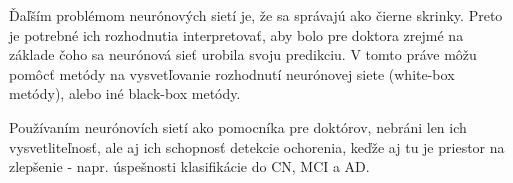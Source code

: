 Ďaľším problémom neurónových sietí je, že sa správajú ako čierne skrinky. Preto je potrebné ich rozhodnutia interpretovať, aby bolo pre doktora zrejmé na základe čoho sa neurónová sieť urobila svoju predikciu. V tomto práve môžu pomôcť metódy na vysvetľovanie rozhodnutí neurónovej siete (white-box metódy), alebo iné black-box metódy.

Používaním neurónovích sietí ako pomocníka pre doktórov, nebráni len ich vysvetliteľnosť, ale aj ich schopnosť detekcie ochorenia, keďže aj tu je priestor na zlepšenie - napr. úspešnosti klasifikácie do CN, MCI a AD.

